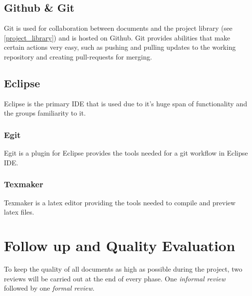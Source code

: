 \documentclass{article}
\begin{document}
    \subsection{Github \& Git}
    Git is used for collaboration between documents and the project library (see \ref{project_library})
    and is hosted on Github. Git provides abilities that make certain actions very
    easy, such as pushing and pulling updates to the working repository and creating pull-requests for merging.
    
    \subsection{Eclipse}
        Eclipse is the primary IDE that is used due to it's huge span of functionality and the groups familiarity to it.
    
    \subsubsection{Egit}
        Egit is a plugin for Eclipse provides the tools needed for a git workflow 
        in Eclipse IDE.
        
    \subsubsection{Texmaker}
        Texmaker is a latex editor providing the tools needed to compile and preview latex files.
    
\section{Follow up and Quality Evaluation \label{followup}}
    To keep the quality of all documents as high as possible during the project,
    two reviews will be carried out at the end of every phase. One \textit{informal review}
    followed by one \textit{formal review}.
\end{document}
